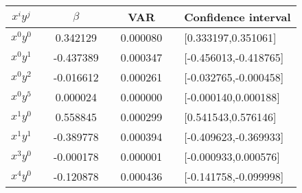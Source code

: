 \begin{center}
\label{tab:lasso-var-conf}
\begin{tabularx}{\textwidth}{c X c X c X l}
    \hline
    \hline
        $x^iy^j$ && $\beta$ && VAR && Confidence interval\\
    \hline
        $x^0y^0$ && 0.342129   && 0.000080   && [0.333197,0.351061] \\
        $x^0y^1$ && -0.437389  && 0.000347   && [-0.456013,-0.418765] \\
        $x^0y^2$ && -0.016612  && 0.000261   && [-0.032765,-0.000458] \\
        $x^0y^5$ && 0.000024   && 0.000000   && [-0.000140,0.000188] \\
        $x^1y^0$ && 0.558845   && 0.000299   && [0.541543,0.576146] \\
        $x^1y^1$ && -0.389778  && 0.000394   && [-0.409623,-0.369933] \\
        $x^3y^0$ && -0.000178  && 0.000001   && [-0.000933,0.000576] \\
        $x^4y^0$ && -0.120878  && 0.000436   && [-0.141758,-0.099998] \\
    \hline
\end{tabularx}
\end{center}

\pagebreak

